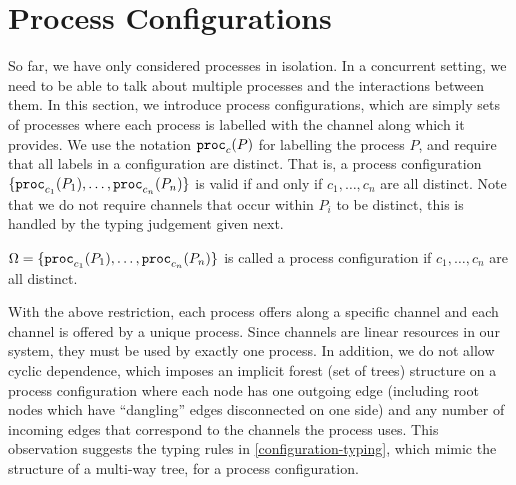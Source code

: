 
\section{Process Configurations}
\label{chapter/session-types/configurations}

So far, we have only considered processes in isolation. In a concurrent setting, we need to be able to talk about multiple processes and the interactions between them. In this section, we introduce process configurations, which are simply sets of processes where each process is labelled with the channel along which it provides. We use the notation $\mathtt{proc}_{c}(P)$ for labelling the process $P$, and require that all labels in a configuration are distinct. That is, a process configuration $\lbrace\mathtt{proc}_{c_1}(P_1), \ldots, \mathtt{proc}_{c_n}(P_n)\rbrace$ is valid if and only if $c_1, \ldots, c_n$ are all distinct. Note that we do not require channels that occur within $P_i$ to be distinct, this is handled by the typing judgement given next.

\begin{definition}
  $\Omega = \lbrace\mathtt{proc}_{c_1}(P_1), \ldots, \mathtt{proc}_{c_n}(P_n)\rbrace$ is called a process configuration if $c_1, \ldots, c_n$ are all distinct.
\end{definition}

With the above restriction, each process offers along a specific channel and each channel is offered by a unique process. Since channels are linear resources in our system, they must be used by exactly one process. In addition, we do not allow cyclic dependence, which imposes an implicit forest (set of trees) structure on a process configuration where each node has one outgoing edge (including root nodes which have ``dangling'' edges disconnected on one side) and any number of incoming edges that correspond to the channels the process uses. This observation suggests the typing rules in \cref{configuration-typing}, which mimic the structure of a multi-way tree, for a process configuration.


